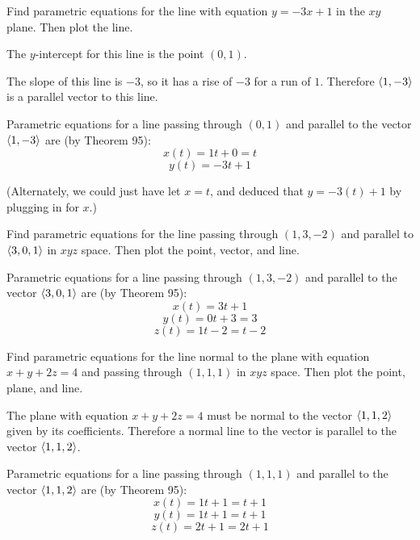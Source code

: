 \documentclass[letterpaper, twoside, 12pt]{book}
\begin{document}
          \begin{problem}
            Find parametric equations for the line with equation $y=-3x+1$
            in the $xy$ plane. Then plot the line.
          \end{problem}

          \begin{solution}
  The $y$-intercept for this line is the point $(0,1)$.

  The slope of this line is $-3$, so it has a rise of $-3$ for a run of $1$.
  Therefore $\langle1,-3\rangle$ is a parallel vector to this line.

  Parametric equations for a line passing through $(0,1)$ and parallel
  to the vector $\langle1,-3\rangle$ are (by Theorem 95):
  \[
    x(t) = 1t + 0 = t
  \]
  \[
    y(t) = -3t + 1
  \]

  (Alternately, we could just have let $x=t$, and deduced that
  $y=-3(t)+1$ by plugging in for $x$.)
          \end{solution}

          \begin{problem}
            Find parametric equations for the line passing through $(1,3,-2)$
            and parallel to $\langle3,0,1\rangle$ in $xyz$ space. Then plot the point,
            vector, and line.
          \end{problem}

          \begin{solution}
  Parametric equations for a line passing through $(1,3,-2)$ and parallel
  to the vector $\langle3,0,1\rangle$ are (by Theorem 95):
  \[
    x(t) = 3t + 1
  \]
  \[
    y(t) = 0t + 3 = 3
  \]
  \[
    z(t) = 1t - 2 = t - 2
  \]
          \end{solution}

          \begin{problem}
            Find parametric equations for the line normal to the plane with
            equation $x+y+2z=4$ and passing through $(1,1,1)$ in $xyz$ space.
            Then plot the point, plane, and line.
          \end{problem}

          \begin{solution}
  The plane with equation $x+y+2z=4$ must be normal to the vector $\langle1,1,2\rangle$
  given by its coefficients. Therefore a normal line to the vector is
  parallel to the vector $\langle1,1,2\rangle$.

  Parametric equations for a line passing through $(1,1,1)$ and parallel
  to the vector $\langle1,1,2\rangle$ are (by Theorem 95):
  \[
    x(t) = 1t + 1 = t + 1
  \]
  \[
    y(t) = 1t + 1 = t + 1
  \]
  \[
    z(t) = 2t + 1 = 2t + 1
  \]
          \end{solution}
\end{document}
